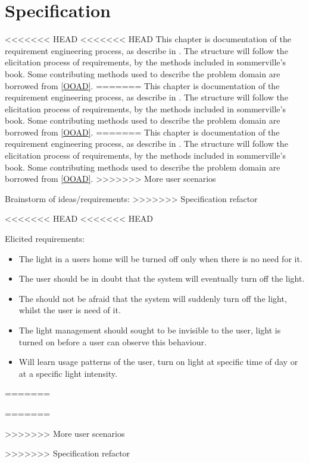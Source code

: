 \chapter{Specification}

<<<<<<< HEAD
<<<<<<< HEAD
This chapter is documentation of the requirement engineering process, as describe in \cite{sommerville}. The structure will follow the elicitation process of requirements, by the methods included in sommerville's book. Some contributing methods used to describe the problem domain are borrowed from \cref{OOAD}. 
=======
This chapter is documentation of the requirement engineering process, as describe in \citep{sommerville}. The structure will follow the elicitation process of requirements, by the methods included in sommerville's book. Some contributing methods used to describe the problem domain are borrowed from \cref{OOAD}. 
=======
This chapter is documentation of the requirement engineering process, as describe in \cite{sommerville}. The structure will follow the elicitation process of requirements, by the methods included in sommerville's book. Some contributing methods used to describe the problem domain are borrowed from \cref{OOAD}. 
>>>>>>> More user scenarios

Brainstorm of ideas/requirements:
>>>>>>> Specification refactor







<<<<<<< HEAD
<<<<<<< HEAD





Elicited requirements: %

\begin{itemize}
\item The light in a users home will be turned off only when there is no need for it.
\item The user should be in doubt that the system will eventually turn off the light.
\item The should not be afraid that the system will suddenly turn off the light, whilst the user is need of it.
\item The light management should sought to be invisible to the user, light is turned on before a user can observe this behaviour.
\item Will learn usage patterns of the user, turn on light at specific time of day or at a specific light intensity.
\end{itemize}
=======

=======

>>>>>>> More user scenarios



>>>>>>> Specification refactor
